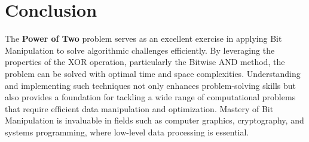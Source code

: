 \section*{Conclusion}

The \textbf{Power of Two} problem serves as an excellent exercise in applying Bit Manipulation to solve algorithmic challenges efficiently. By leveraging the properties of the XOR operation, particularly the Bitwise AND method, the problem can be solved with optimal time and space complexities. Understanding and implementing such techniques not only enhances problem-solving skills but also provides a foundation for tackling a wide range of computational problems that require efficient data manipulation and optimization. Mastery of Bit Manipulation is invaluable in fields such as computer graphics, cryptography, and systems programming, where low-level data processing is essential.

\printindex

% 
% 
% 
% 
% 
% 
% 
% 